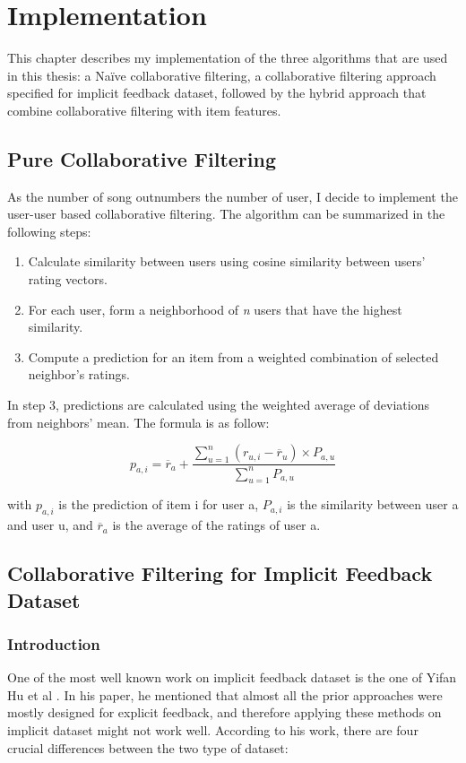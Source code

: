 \chapter{Implementation} %

\label{Chapter4}

This chapter describes my implementation of the three algorithms that are used in this thesis: a Na\"ive collaborative filtering, a collaborative filtering approach specified for implicit feedback dataset, followed by the hybrid approach that combine collaborative filtering with item features.

\section{Pure Collaborative Filtering}
As the number of song outnumbers the number of user, I decide to implement the user-user based collaborative filtering. The algorithm can be summarized in the following steps:

\begin{enumerate}
	\item Calculate similarity between users using cosine similarity between users' rating vectors. 
	\item For each user, form a neighborhood of \textit{n} users that have the highest similarity.
	\item Compute a prediction for an item from a weighted combination of selected neighbor's ratings. 
\end{enumerate}

In step 3, predictions are calculated using the weighted average of deviations from neighbors' mean. The formula is as follow:

\begin{displaymath}
p_{a,i} = \overline{r}_a + \frac{\sum_{u=1}^{n} (r_{u,i} - \overline{r}_{u}) \times P_{a,u}}{\sum_{u=1}^{n} P_{a,u}}  \tag{1} 
\end{displaymath}

with \(p_{a,i} \) is the prediction of item i for user a, \(P_{a,i}\) is the similarity between user a and user u, and \(\overline{r}_a\) is the average of the ratings of user a.  

\section{Collaborative Filtering for Implicit Feedback Dataset}

\subsection{Introduction}
One of the most well known work on implicit feedback dataset is the one of Yifan Hu et al \cite{hu2008collaborative}. In his paper, he mentioned that almost all the prior approaches were mostly designed for explicit feedback, and therefore applying these methods on implicit dataset might not work well. According to his work, there are four crucial differences between the two type of dataset:

